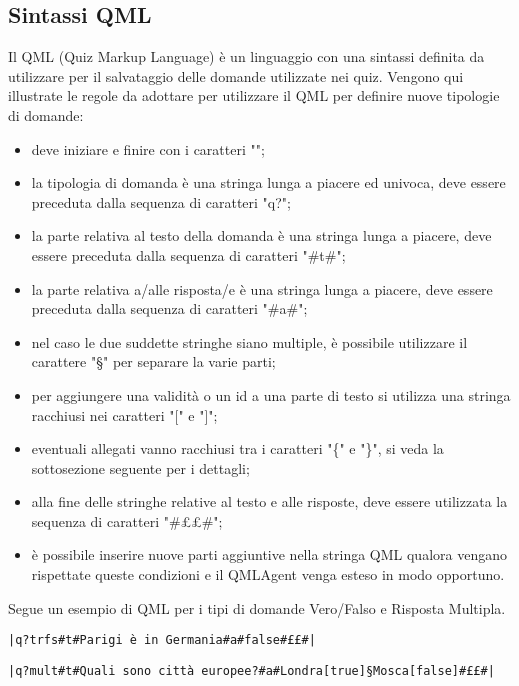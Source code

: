 \documentclass[a4paper, titlepage]{article}
\begin{document}
	\subsection{Sintassi QML}
	\label{qml}
	Il QML (Quiz Markup Language) è un linguaggio con una sintassi definita da utilizzare per il salvataggio delle domande utilizzate nei quiz.
	Vengono qui illustrate le regole da adottare per utilizzare il QML per definire nuove tipologie di domande:
	\begin{itemize}
		\item deve iniziare e finire con i caratteri "\textbar";
		\item la tipologia di domanda è una stringa lunga a piacere ed univoca, deve essere preceduta dalla sequenza di caratteri "q?";
		\item la parte relativa al testo della domanda è una stringa lunga a piacere, deve essere preceduta dalla sequenza di caratteri "\#t\#";
		\item la parte relativa a/alle risposta/e è una stringa lunga a piacere, deve essere preceduta dalla sequenza di caratteri "\#a\#";
		\item nel caso le due suddette stringhe siano multiple, è possibile utilizzare il carattere "§" per separare la varie parti;
		\item per aggiungere una validità o un id a una parte di testo si utilizza una stringa racchiusi  nei caratteri "[" e "]";
		\item eventuali allegati vanno racchiusi tra i caratteri "\{" e "\}", si veda la sottosezione seguente per i dettagli;
		\item alla fine delle stringhe relative al testo e alle risposte, deve essere utilizzata la sequenza di caratteri "\#££\#";
		\item è possibile inserire nuove parti aggiuntive nella stringa QML qualora vengano rispettate queste condizioni e il QMLAgent venga esteso in modo opportuno.
	\end{itemize}
	Segue un esempio di QML per i tipi di domande Vero/Falso e Risposta Multipla.
	\begin{verbatim}|q?trfs#t#Parigi è in Germania#a#false#££#|\end{verbatim}
	\begin{verbatim}|q?mult#t#Quali sono città europee?#a#Londra[true]§Mosca[false]#££#|\end{verbatim}
	
\end{document}
